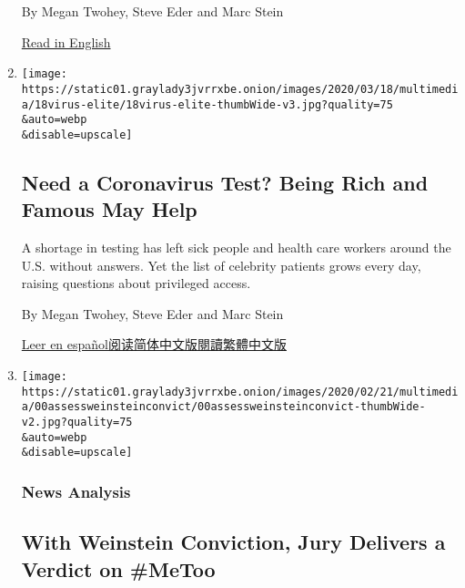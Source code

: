 \begin{enumerate}
  By Megan Twohey, Steve Eder and Marc Stein

  \href{https://www.nytimes3xbfgragh.onion/2020/03/18/us/coronavirus-testing-elite.html}{Read
  in English}
\item
  \href{/2020/03/18/us/coronavirus-testing-elite.html}{}

  \texttt{[image: https://static01.graylady3jvrrxbe.onion/images/2020/03/18/multimedia/18virus-elite/18virus-elite-thumbWide-v3.jpg?quality=75\\\&auto=webp\\\&disable=upscale]}

  \hypertarget{need-a-coronavirus-test-being-rich-and-famous-may-help}{%
  \subsection{Need a Coronavirus Test? Being Rich and Famous May
  Help}\label{need-a-coronavirus-test-being-rich-and-famous-may-help}}

  A shortage in testing has left sick people and health care workers
  around the U.S. without answers. Yet the list of celebrity patients
  grows every day, raising questions about privileged access.

  By Megan Twohey, Steve Eder and Marc Stein

  \href{https://www.nytimes3xbfgragh.onion/es/2020/03/19/espanol/coronavirus-celebridades.html}{Leer
  en
  español}\href{https://cn.nytimes3xbfgragh.onion/usa/20200320/coronavirus-testing-elite/}{阅读简体中文版}\href{https://cn.nytimes3xbfgragh.onion/usa/20200320/coronavirus-testing-elite/zh-hant}{閱讀繁體中文版}
\item
  \href{/2020/02/24/us/harvey-weinstein-verdict-metoo.html}{}

  \texttt{[image: https://static01.graylady3jvrrxbe.onion/images/2020/02/21/multimedia/00assessweinsteinconvict/00assessweinsteinconvict-thumbWide-v2.jpg?quality=75\\\&auto=webp\\\&disable=upscale]}

  \hypertarget{news-analysis}{%
  \subsubsection{News Analysis}\label{news-analysis}}

  \hypertarget{with-weinstein-conviction-jury-delivers-a-verdict-on-metoo}{%
  \subsection{With Weinstein Conviction, Jury Delivers a Verdict on
  \#MeToo}\label{with-weinstein-conviction-jury-delivers-a-verdict-on-metoo}}


\end{enumerate}
